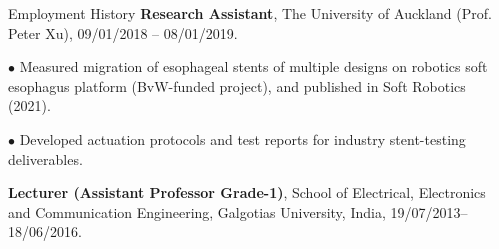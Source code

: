 \begin{rubric}{Employment History}
    \entry*[2018 -- 2019]%
        \textbf{Research Assistant}, The University of Auckland (Prof. Peter Xu), 09/01/2018 -- 08/01/2019.
        \par $\bullet$ Measured migration of esophageal stents of multiple designs on robotics soft esophagus platform (BvW-funded project), and published in Soft Robotics (2021).
        \par $\bullet$ Developed actuation protocols and test reports for industry stent-testing deliverables.
        
    \entry*[2013 -- 2016]%
        \textbf{Lecturer (Assistant Professor Grade-1)}, School of Electrical, Electronics and Communication Engineering, Galgotias University, India, 19/07/2013--18/06/2016.
    
    \end{rubric}